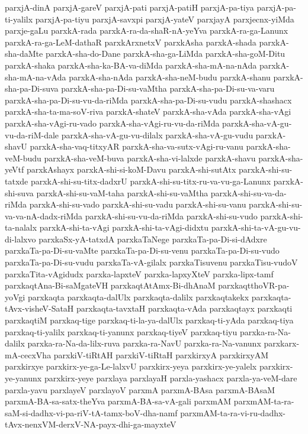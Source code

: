 {parxjA-dinA
parxjA-gareV
parxjA-pati
parxjA-patiH
parxjA-pa-tiya
parxjA-pa-ti-yalilx
parxjA-pa-tiyu
parxjA-savxpi
parxjA-yateV
parxjayA
parxjecnx-yiMda
parxje-gaLu
parxkA-rada
parxkA-ra-da-shaR-nA-yeYva
parxkA-ra-ga-Lanunx
parxkA-ra-ga-LeM-dathaR
parxkArxnetxV
parxkAsha
parxkA-shada
parxkA-sha-daMte
parxkA-sha-do-Dane
parxkA-sha-ga-LiMda
parxkA-sha-goM-Ditu
parxkA-shaka
parxkA-sha-ka-BA-va-diMda
parxkA-sha-mA-na-nAda
parxkA-sha-mA-na-vAda
parxkA-sha-nAda
parxkA-sha-neM-budu
parxkA-shanu
parxkA-sha-pa-Di-suva
parxkA-sha-pa-Di-su-vaMtha
parxkA-sha-pa-Di-su-va-varu
parxkA-sha-pa-Di-su-vu-da-riMda
parxkA-sha-pa-Di-su-vudu
parxkA-shashacx
parxkA-sha-ta-ma-soV-riva
parxkA-shateV
parxkA-sha-vAda
parxkA-sha-vAgi
parxkA-sha-vAgi-ru-vado
parxkA-sha-vAgi-ru-vu-da-riMda
parxkA-sha-vA-gu-vu-da-riM-dale
parxkA-sha-vA-gu-vu-dilalx
parxkA-sha-vA-gu-vudu
parxkA-shavU
parxkA-sha-vaq-titxyAR
parxkA-sha-va-sutx-vAgi-ru-vanu
parxkA-sha-veM-budu
parxkA-sha-veM-buva
parxkA-sha-vi-lalxde
parxkA-shavu
parxkA-sha-yeVtf
parxkAshayx
parxkA-shi-si-koM-Davu
parxkA-shi-sutAtx
parxkA-shi-su-tatxde
parxkA-shi-su-titx-dadxrU
parxkA-shi-su-titx-ru-va-vu-ga-Lanunx
parxkA-shi-suva
parxkA-shi-su-vaM-taha
parxkA-shi-su-vaMtha
parxkA-shi-su-va-da-riMda
parxkA-shi-su-vado
parxkA-shi-su-vadu
parxkA-shi-su-vanu
parxkA-shi-su-va-va-nA-dadx-riMda
parxkA-shi-su-vu-da-riMda
parxkA-shi-su-vudo
parxkA-shi-ta-nalalx
parxkA-shi-ta-vAgi
parxkA-shi-ta-vAgi-didxtu
parxkA-shi-ta-vA-gu-vu-di-lalxvo
parxkaSx-yA-tatxdA
parxkaTaNege
parxkaTa-pa-Di-si-dAdxre
parxkaTa-pa-Di-su-vaMte
parxkaTa-pa-Di-su-venu
parxkaTa-pa-Di-su-vudo
parxkaTa-pa-Di-su-vudu
parxkaTa-vA-gilalx
parxkaTisuvenu
parxkaTisu-vudoV
parxkaTita-vAgidudx
parxka-lapxteV
parxka-lapxyXteV
parxka-lipx-tamf
parxkaqtAna-Bi-saMgateVH
parxkaqtAtAmx-Bi-dhAnaM
parxkaqtthoVR-pa-yoVgi
parxkaqta
parxkaqta-dalUlx
parxkaqta-dalilx
parxkaqtakekx
parxkaqta-tAvx-visheV-SataH
parxkaqta-tavxtaH
parxkaqta-vAda
parxkaqtayx
parxkaqti
parxkaqtiM
parxkaq-tige
parxkaq-ti-la-ya-dalUlx
parxkaq-ti-yAda
parxkaq-tiya
parxkaq-ti-yalilx
parxkaq-ti-yanunx
parxkaq-tiyeV
parxkaq-tiyu
parxka-ra-Na-dalilx
parxka-ra-Na-da-lilx-ruva
parxka-ra-NavU
parxka-ra-Na-vanunx
parxkarx-mA-cecxVha
parxkiV-tiRtAH
parxkiV-tiRtaH
parxkirxyA
parxkirxyAM
parxkirxye
parxkirx-ye-ga-Le-lalxvU
parxkirx-yeya
parxkirx-ye-yalelx
parxkirx-ye-yanunx
parxkirx-yeye
parxlaya
parxlayaH
parxla-yashacx
parxla-ya-veM-dare
parxla-yavu
parxlayeV
parxlayoV
parxmA
parxmA-BAsa
parxmA-BAsaM
parxmA-BA-sa-satx-theYva
parxmA-BA-sa-vA-gali
parxmAM
parxmAM-ta-ra-saM-si-dadhx-vi-pa-riV-tA-tamx-boV-dha-namf
parxmAM-ta-ra-vi-ru-dadhx-tAvx-nenxVM-derxV-NA-payx-dhi-ga-mayxteV
}
